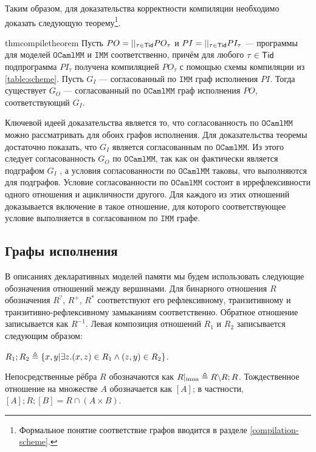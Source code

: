 \documentclass[14pt]{matmex-diploma-custom}
\newcommand{\IMM}{\mathtt{IMM}}
\newcommand{\OMM}{\mathtt{OCaml}\allowbreak \mathtt{MM}}
\begin{document}
Таким образом, для доказательства корректности компиляции необходимо доказать
следующую теорему\footnote{Формальное понятие соответствие графов вводится в разделе \ref{compilation-scheme}.}.

\begin{restatable}{thm}{compiletheorem}
  \label{prop:compile-theorem}
  Пусть $PO=||_{\tau\in \mathsf{Tid}} PO_\tau$ и $PI=||_{\tau\in \mathsf{Tid}} PI_\tau$ --- программы для моделей $\OMM$ и $\IMM$ соответственно, причём для любого $\tau \in \mathsf{Tid}$ подпрограмма $PI_\tau$ получена компиляцией $PO_\tau$ с помощью схемы компиляции из \cref{table:scheme}. Пусть $G_I$ --- согласованный по $\IMM$ граф исполнения $PI$. Тогда существует $G_O$ --- согласованный по $\OMM$ граф исполнения $PO$, соответствующий $G_I$. 
\end{restatable}


Ключевой идеей доказательства является то, что согласованность по $\OMM$ можно рассматривать для обоих графов исполнения. Для доказательства теоремы достаточно показать, что $G_I$ является согласованным по $\OMM$. Из этого следует согласованность $G_O$ по $\OMM$, так как он фактически является подграфом $G_I$ , а условия согласованности по $\OMM$ таковы, что выполняются для подграфов. Условие согласованности по $\OMM$ состоит в иррефлексивности одного отношения и ацикличности другого. Для каждого из этих отношений доказывается включение в такое отношение, для которого соответствующее условие выполняется в согласованном по $\IMM$ графе.

\subsection{Графы исполнения}
\label{exec-graphs}

В описаниях декларативных моделей памяти мы будем использовать следующие обозначения отношений между вершинами. Для бинарного отношения $R$ обозначения $R^?$, $R^{+}$, $R^{*}$ соответствуют его рефлексивному, транзитивному и транзитивно-рефлексивному замыканиям соответственно. Обратное отношение записывается как $R^{-1}$. Левая композиция отношений $R_1$ и $R_2$ записывается следующим образом:

$R_1;R_2 \triangleq \{{x, y | \exists z. (x, z) \in R_1 \land (z, y) \in R_2}\}$.

Непосредственные рёбра $R$ обозначаются как ${R}{|_{\text{imm}}} \triangleq R \backslash R;R$. Тождественное отношение на множестве $A$ обозначается как $[A]$; в частности, $[A];R;[B] = R \cap (A \times B)$.
\end{document}
